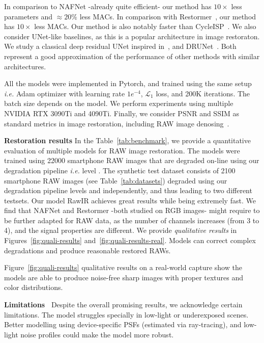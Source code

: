 \documentclass{article}
\newcommand{\RNum}[1]{\uppercase\expandafter{\romannumeral #1\relax}}
\newcommand{\tref}[1]{Table~\ref{#1}}
\newcommand{\ie}{\emph{i.e.} }
\begin{document}
In comparison to NAFNet -already quite efficient- our method has $10\times$ less parameters and $\approx20\%$ less MACs. In comparison with Restormer~\cite{zamir2022restormer}, our method has $10\times$ less MACs. Our method is also notably faster than CycleISP~\cite{zamir2020cycleisp}.
%
We also consider UNet-like baselines, as this is a popular architecture in image restoraton. We study a classical deep residual UNet inspired in~\cite{brooks2019unprocessing}, and DRUNet~\cite{zhang2021DPIR}. Both represent a good approximation of the performance of other methods with similar architectures.%

All the models were implemented in Pytorch, and trained using the same setup \ie Adam optimizer with learning rate $1e^{-4}$, $\mathcal{L}_1$ loss, and 200K iterations. The batch size depends on the model. We perform experiments using multiple NVIDIA RTX 3090Ti and 4090Ti.
%
Finally, we consider PSNR and SSIM as standard metrics in image restoration, including RAW image denosing~\cite{abdelhamed2018high}.

\vspace{3mm}

\noindent\textbf{Restoration results} In the \tref{tab:benchmark}, we provide a quantitative evaluation of multiple models for RAW image restoration. The models were trained using 22000 smartphone RAW images that are degraded on-line using our degradation pipeline \ie level \RNum{2}.
%
The synthetic test dataset consists of 2100 smartphone RAW images (see Table~\ref{tab:datasets}) degraded using our degradation pipeline levels \RNum{1} and \RNum{2} independently, and thus leading to two different testsets. Our model RawIR achieves great results while being extremely fast. 
%
We find that NAFNet and Restormer -both studied on RGB images- might require to be further adapted for RAW data, as the number of channels increases (from 3 to 4), and the signal properties are different. We provide \emph{qualitative results} in Figures~\ref{fig:quali-results} and~\ref{fig:quali-results-real}. Models can correct complex degradations and produce reasonable restored RAWs.

Figure~\ref{fig:quali-results} qualitative results on a real-world capture show the models are able to produce noise-free sharp images with proper textures and color distributions.



\noindent\textbf{Limitations~} Despite the overall promising results, we acknowledge certain limitations. The model struggles specially in low-light or underexposed scenes. Better modelling using device-specific PSFs (estimated via ray-tracing), and low-light noise profiles could make the model more robust.
\end{document}
